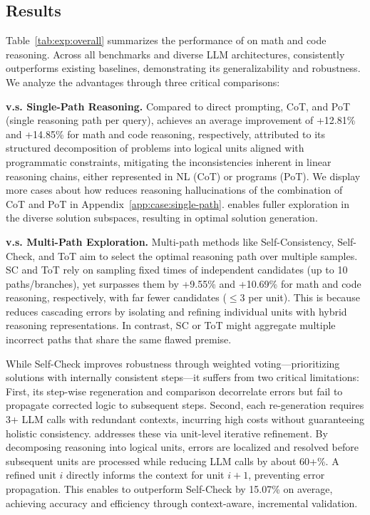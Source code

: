 \subsection{Results}


Table~\ref{tab:exp:overall} summarizes the performance of \tool on math and code reasoning.
Across all benchmarks and diverse LLM architectures, \tool consistently outperforms existing baselines, demonstrating its generalizability and robustness.
We analyze the advantages through three critical comparisons:

\noindent\textbf{\tool v.s. Single-Path Reasoning.} 
Compared to direct prompting, CoT, and PoT (single reasoning path per query), \tool achieves an average improvement of +12.81\% and +14.85\% for math and code reasoning, respectively, attributed to its structured decomposition of problems into logical units aligned with programmatic constraints, mitigating the inconsistencies inherent in linear reasoning chains, either represented in NL (CoT) or programs (PoT).
We display more cases about how \tool reduces reasoning hallucinations of the combination of CoT and PoT in Appendix~\ref{app:case:single-path}.
\tool enables fuller exploration in the diverse solution subspaces, resulting in optimal solution generation.

\noindent\textbf{\tool v.s. Multi-Path Exploration.}
Multi-path methods like Self-Consistency, Self-Check, and ToT aim to select the optimal reasoning path over multiple samples.
SC and ToT rely on sampling fixed times of independent candidates (up to 10 paths/branches), yet \tool surpasses them by +9.55\% and +10.69\% for math and code reasoning, respectively, with far fewer candidates ($\leq 3$ per unit).
This is because \tool reduces cascading errors by isolating and refining individual units with hybrid reasoning representations. In contrast, SC or ToT might aggregate multiple incorrect paths that share the same flawed premise.

While Self-Check improves robustness through weighted voting—prioritizing solutions with internally consistent steps—it suffers from two critical limitations:
First, its step-wise regeneration and comparison decorrelate errors but fail to propagate corrected logic to subsequent steps.
Second, each re-generation requires 3+ LLM calls with redundant contexts, incurring high costs without guaranteeing holistic consistency.
\tool addresses these via unit-level iterative refinement. By decomposing reasoning into logical units, errors are localized and resolved before subsequent units are processed while reducing LLM calls by about 60+\%. A refined unit $i$ directly informs the context for unit $i+1$, preventing error propagation.
This enables \tool to outperform Self-Check by 15.07\% on average, achieving accuracy and efficiency through context-aware, incremental validation.


